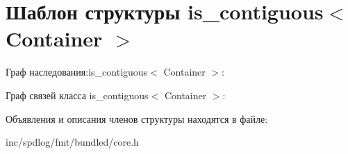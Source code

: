 \hypertarget{structis__contiguous}{}\section{Шаблон структуры is\+\_\+contiguous$<$ Container $>$}
\label{structis__contiguous}


Граф наследования\+:is\+\_\+contiguous$<$ Container $>$\+:


Граф связей класса is\+\_\+contiguous$<$ Container $>$\+:


Объявления и описания членов структуры находятся в файле\+:\begin{DoxyCompactItemize}
\item 
inc/spdlog/fmt/bundled/core.\+h\end{DoxyCompactItemize}

